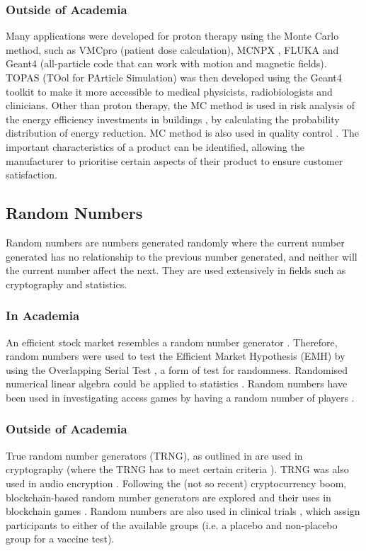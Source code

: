 \documentclass[10pt, twocolumn]{article}
\begin{document}
\subsubsection{Outside of Academia} %
Many applications were developed for proton therapy using the Monte Carlo method, such as VMCpro \cite{FippelSoukup2004} (patient dose calculation), MCNPX \cite{Waters2002}, FLUKA \cite{Ferrari2005} and Geant4 \cite{Geant4} \cite{Geant4_2} (all-particle code that can work with motion and magnetic fields). TOPAS (TOol for PArticle Simulation) \cite{Perl2012}\cite{Faddegon2020} was then developed using the Geant4 toolkit to make it more accessible to medical physicists, radiobiologists and clinicians. Other than proton therapy, the MC method is used in risk analysis of the energy efficiency investments in buildings \cite{Togashi2019}, by calculating the probability distribution of energy reduction. MC method is also used in quality control \cite{Moran2023}. The important characteristics of a product can be identified, allowing the manufacturer to prioritise certain aspects of their product to ensure customer satisfaction.

\subsection{Random Numbers} %
Random numbers are numbers generated randomly where the current number generated has no relationship to the previous number generated, and neither will the current number affect the next. They are used extensively in fields such as cryptography and statistics.

\subsubsection{In Academia}
An efficient stock market resembles a random number generator \cite{Doyle2013}. Therefore, random numbers were used to test the Efficient Market Hypothesis (EMH) \cite{Yen2008} by using the Overlapping Serial Test \cite{Good1953}, a form of test for randomness. Randomised numerical linear algebra \cite{Martinsson2020} could be applied to statistics \cite{Gentle2012}. Random numbers have been used in investigating access games by having a random number of players \cite{Tembine2008}.

\subsubsection{Outside of Academia} %
True random number generators (TRNG), as outlined in \cite{Sunar2009} are used in cryptography (where the TRNG has to meet certain criteria \cite{Latham2001}). TRNG was also used in audio encryption \cite{Etem2020}. Following the (not so recent) cryptocurrency boom, blockchain-based random number generators \cite{Hsieh2022} are explored and their uses in blockchain games \cite{Du2019}. Random numbers are also used in clinical trials \cite{Beller2002}, which assign participants to either of the available groups (i.e. a placebo and non-placebo group for a vaccine test).
\end{document}
